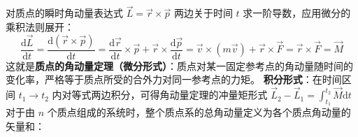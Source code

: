 对质点的瞬时角动量表达式 $\vec{L} = \vec{r} \times \vec{p}$ 两边关于时间 $t$ 求一阶导数，应用微分的乘积法则展开：
\[
\frac{\mathrm{d}\vec{L}}{\mathrm{d}t} = \frac{\mathrm{d}(\vec{r} \times \vec{p})}{\mathrm{d}t} = \frac{\mathrm{d}\vec{r}}{\mathrm{d}t} \times \vec{p} + \vec{r} \times \frac{\mathrm{d}\vec{p}}{\mathrm{d}t}= \vec{v} \times (m\vec{v})+ \vec{r} \times \vec{F} = \vec{r} \times \vec{F}=\vec{M}
\]
这就是\textbf{质点的角动量定理（微分形式）}：质点对某一固定参考点的角动量随时间的变化率，严格等于质点所受的合外力对同一参考点的力矩。
\textbf{积分形式}：在时间区间 $t_1 \to t_2$ 内对等式两边积分，可得角动量定理的冲量矩形式 \(\vec{L}_2 - \vec{L}_1 = \int_{t_1}^{t_2} \vec{M}\mathrm{d}t\) 
对于由 $n$ 个质点组成的系统时，整个质点系的总角动量定义为各个质点角动量的矢量和：
